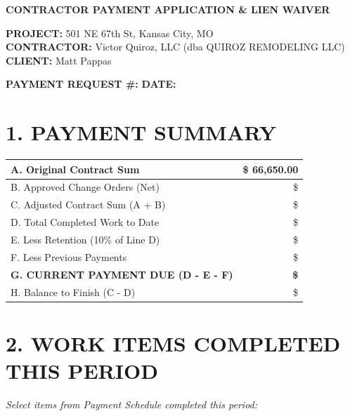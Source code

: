 \documentclass[10pt,letterpaper]{article}
\begin{document}
\begin{center}
{\Large\bfseries CONTRACTOR PAYMENT APPLICATION \& LIEN WAIVER}
\end{center}

\vspace{1em}

\noindent\textbf{PROJECT:} 501 NE 67th St, Kansas City, MO\\
\textbf{CONTRACTOR:} Victor Quiroz, LLC (dba QUIROZ REMODELING LLC)\\
\textbf{CLIENT:} Matt Pappas

\vspace{1em}

\noindent\textbf{PAYMENT REQUEST \#:} \underline{\hspace{3cm}} \hspace{2cm} \textbf{DATE:} \underline{\hspace{3cm}}

\section*{1. PAYMENT SUMMARY}
\begin{tabularx}{\textwidth}{|X|r|}
\hline
A. Original Contract Sum & \$ 66,650.00 \\
\hline
B. Approved Change Orders (Net) & \$ \underline{\hspace{3cm}} \\
\hline
C. Adjusted Contract Sum (A + B) & \$ \underline{\hspace{3cm}} \\
\hline
D. Total Completed Work to Date & \$ \underline{\hspace{3cm}} \\
\hline
E. Less Retention (10\% of Line D) & \$ \underline{\hspace{3cm}} \\
\hline
F. Less Previous Payments & \$ \underline{\hspace{3cm}} \\
\hline
\textbf{G. CURRENT PAYMENT DUE (D - E - F)} & \textbf{\$} \underline{\hspace{3cm}} \\
\hline
H. Balance to Finish (C - D) & \$ \underline{\hspace{3cm}} \\
\hline
\end{tabularx}

\section*{2. WORK ITEMS COMPLETED THIS PERIOD}
\noindent\textit{Select items from Payment Schedule completed this period:}
\end{document}
